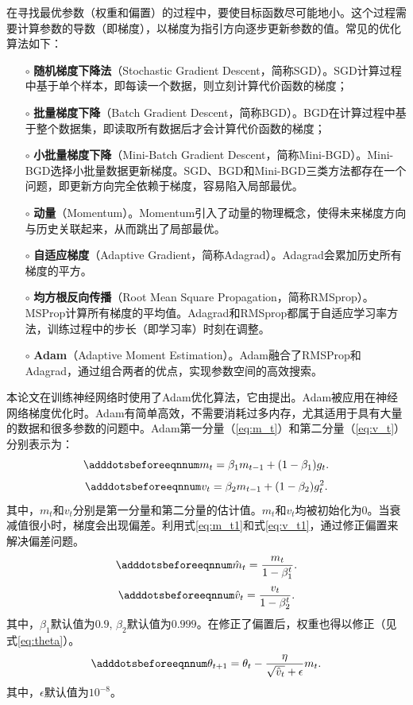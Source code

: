 在寻找最优参数（权重和偏置）的过程中，要使目标函数尽可能地小。这个过程需要计算参数的导数（即梯度），以梯度为指引方向逐步更新参数的值。常见的优化算法如下：
\begin{itemize}
  \item[$\circ$] \textbf{随机梯度下降法}（Stochastic Gradient Descent，简称SGD）。SGD计算过程中基于单个样本，即每读一个数据，则立刻计算代价函数的梯度；
  \item[$\circ$] \textbf{批量梯度下降}（Batch Gradient Descent，简称BGD）。BGD在计算过程中基于整个数据集，即读取所有数据后才会计算代价函数的梯度；
  \item[$\circ$] \textbf{小批量梯度下降}（Mini-Batch Gradient Descent，简称Mini-BGD）。Mini-BGD选择小批量数据更新梯度。SGD、BGD和Mini-BGD三类方法都存在一个问题，即更新方向完全依赖于梯度，容易陷入局部最优。
  \item[$\circ$] \textbf{动量}（Momentum）。Momentum引入了动量的物理概念，使得未来梯度方向与历史关联起来，从而跳出了局部最优。
  \item[$\circ$] \textbf{自适应梯度}（Adaptive Gradient，简称Adagrad）。Adagrad会累加历史所有梯度的平方。
  \item[$\circ$] \textbf{均方根反向传播}（Root Mean Square Propagation，简称RMSprop）。MSProp计算所有梯度的平均值。Adagrad和RMSprop都属于自适应学习率方法，训练过程中的步长（即学习率）时刻在调整。
  \item[$\circ$] \textbf{Adam}（Adaptive Moment Estimation）。Adam融合了RMSProp和Adagrad，通过组合两者的优点，实现参数空间的高效搜索。
\end{itemize}

本论文在训练神经网络时使用了Adam优化算法，它由\citet{kingma2014adam}提出。Adam被应用在神经网络梯度优化时。Adam有简单高效，不需要消耗过多内存，尤其适用于具有大量的数据和很多参数的问题中。Adam第一分量（\ref{eq:m_t}）和第二分量（\ref{eq:v_t}）分别表示为：
\begin{equation}\adddotsbeforeeqnnum 
  \label{eq:m_t}
  m_t = \beta_1 m_{t-1}+(1-\beta_1)g_t.
\end{equation}
\begin{equation}\adddotsbeforeeqnnum 
  \label{eq:v_t}
  v_t = \beta_2 m_{t-1}+(1-\beta_2)g^2_t.
\end{equation}
其中，$m_t$和$v_t$分别是第一分量和第二分量的估计值。$m_t$和$v_t$均被初始化为0。当衰减值很小时，梯度会出现偏差。利用式\ref{eq:m_t1}和式\ref{eq:v_t1}，通过修正偏置来解决偏差问题。
\begin{equation}\adddotsbeforeeqnnum 
  \label{eq:m_t1}
  \hat{m}_t = \frac{m_t}{1-\beta_1^t}.
\end{equation}
\begin{equation}\adddotsbeforeeqnnum 
  \label{eq:v_t1}
  \hat{v}_t = \frac{v_t}{1-\beta_2^t}.
\end{equation}
其中，$\beta_1$默认值为$0.9$, $\beta_2$默认值为$0.999$。在修正了偏置后，权重也得以修正（见式\ref{eq:theta}）。
\begin{equation}\adddotsbeforeeqnnum 
  \label{eq:theta}
  \theta_{t+1}=\theta_t-\frac{\eta}{\sqrt{\hat{v}_t}+\epsilon}m_t.
\end{equation}
其中，$\epsilon$默认值为$10^{-8}$。

